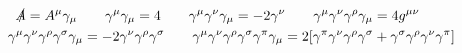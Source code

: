 \begin{gather*}
    \slashed{A} = A^\mu\gamma_\mu
    \qquad
    \gamma^\mu\gamma_\mu = 4
    \qquad
    \gamma^\mu\gamma^\nu\gamma_\mu = -2\gamma^\nu
    \qquad
    \gamma^\mu\gamma^\nu\gamma^\rho\gamma_\mu = 4g^{\mu\nu}
    \qquad
    \\
    \gamma^\mu\gamma^\nu\gamma^\rho\gamma^\sigma\gamma_\mu = -2\gamma^\nu\gamma^\rho\gamma^\sigma
    \qquad
    \gamma^\mu\gamma^\nu\gamma^\rho\gamma^\sigma\gamma^\pi\gamma_\mu = 2\qty[\gamma^\pi\gamma^\nu\gamma^\rho\gamma^\sigma + \gamma^\sigma\gamma^\rho\gamma^\nu\gamma^\pi]
\end{gather*}
